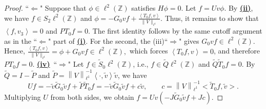 \documentclass[reqno, 11pt]{amsart}
\newcommand\Z{\mathbb{Z}}
\numberwithin{equation}{section}
\begin{document}
\begin{proof}
\vskip0.1cm
``$\bm{\Longleftarrow}$" Suppose that $\phi\in\ell^2(\Z)$ satisfies $H\phi=0$. Let $f=Uv\phi$. By {\bf{\underline{(ii)}}}, we have $f\in S_2\ell^2(\Z)$ and
$\phi=-G_0vf+\frac{\left<T_0f,v\right>}{\|V\|_{\ell^1}}.$
Thus, it remains to show that $\left<f,v_3\right>=0$ and $PT_0f=0$. The first identity follows by the same cutoff argument as in the ``$\bm{\Longleftarrow}$" part of {\bf{\underline{(i)}}}. For the second, the (iii)``$\bm{\Longrightarrow}$" gives
 $G_0vf\in \ell^2(\Z)$. Hence,
$\frac{\left<T_0f,v\right>}{\|V\|_{\ell^1}}=\phi+G_0vf\in \ell^2(\Z),$ which forces $\left<T_0f,v\right>=0$,
and therefore $PT_0f=0$.
\vskip0.3cm
{\textbf{\underline{(iv)}}}~``$\bm{\Longrightarrow}$" Let $f\in \widetilde{S}_0\ell^2(\Z)$, i.e., $f\in \widetilde{Q}\ell^2(\Z)$ and $\widetilde{Q}\widetilde{T}_{0}f=0$. By $\widetilde{Q}=I-\widetilde{P}$ and $\widetilde{P}=\left\|V\right\|^{-1}_{\ell^1}\left<\cdot,\tilde{v}\right>\tilde{v}$, we have
\begin{equation}\label{de of c}
Uf=-\tilde{v}\widetilde{G}_0\tilde{v}f+\widetilde{P}\widetilde{T}_0f=-\tilde{v}\widetilde{G}_0\tilde{v}f+c\tilde{v},\qquad c=\left\|V\right\|^{-1}_{\ell^1}\big<\widetilde{T}_0f,\tilde{v}\big>.
\end{equation}
Multiplying $U$ from both sides, we obtain
$f=Uv(-J\widetilde{G}_0\tilde{v}f+Jc).$ 


\end{proof}
\end{document}
